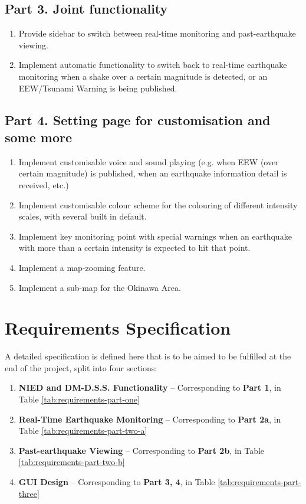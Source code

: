\subsection{Part 3. Joint functionality}
\begin{enumerate}
    \item Provide sidebar to switch between real-time monitoring and past-earthquake viewing.
    \item Implement automatic functionality to switch back to real-time earthquake monitoring when a shake over a certain magnitude is detected, or an EEW/Tsunami Warning is being published.
\end{enumerate}

\subsection{Part 4. Setting page for customisation and some more}
\begin{enumerate}
    \item Implement customisable voice and sound playing (e.g. when EEW (over certain magnitude) is published, when an earthquake information detail is received, etc.)
    \item Implement customisable colour scheme for the colouring of different intensity scales, with several built in default.
    \item Implement key monitoring point with special warnings when an earthquake with more than a certain intensity is expected to hit that point.
    \item Implement a map-zooming feature.
    \item Implement a sub-map for the Okinawa Area.
\end{enumerate}

\section{Requirements Specification}

A detailed specification is defined here that is to be aimed to be fulfilled at the end of the project, split into four sections:
\begin{enumerate}
    \item \textbf{NIED and DM-D.S.S. Functionality} -- Corresponding to \textbf{Part 1}, in Table \ref{tab:requirements-part-one}
    \item \textbf{Real-Time Earthquake Monitoring} -- Corresponding to \textbf{Part 2a}, in Table \ref{tab:requirements-part-two-a}
    \item \textbf{Past-earthquake Viewing} -- Corresponding to \textbf{Part 2b}, in Table \ref{tab:requirements-part-two-b}
    \item \textbf{GUI Design} -- Corresponding to \textbf{Part 3, 4}, in Table \ref{tab:requirements-part-three}
\end{enumerate}

